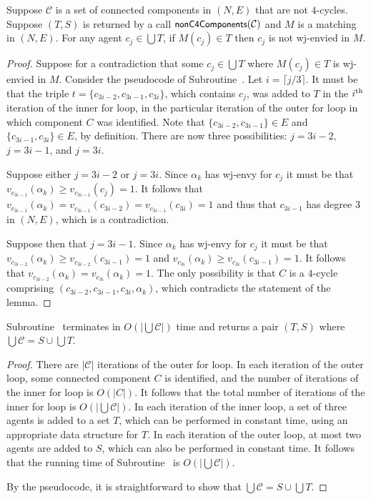 \begin{lem}
\label{lem:threed_efr_as_max_degree_2_subgraph_nonC4s}
Suppose $\mathcal{C}$ is a set of connected components in $(N, E)$ that are not $4$-cycles. Suppose $(T, S)$ is returned by a call $\algorithmfont{nonC4Components}(\mathcal{C})$ and $M$ is a matching in $(N, E)$. For any agent $c_j \in \bigcup T$, if $M(c_j) \in T$ then $c_j$ is not wj-envied in $M$.
\end{lem}
\begin{proof}
Suppose for a contradiction that some $c_j \in \bigcup T$ where $M(c_j) \in T$ is wj-envied in $M$. Consider the pseudocode of Subroutine~. Let $i = \lceil j/3 \rceil$. It must be that the triple $t = \{ c_{3i-2}, c_{3i-1}, c_{3i} \}$, which contains $c_j$, was added to $T$ in the $i\textsuperscript{th}$ iteration of the inner for loop, in the particular iteration of the outer for loop in which component $C$ was identified. Note that $\{ c_{3i-2}, c_{3i-1} \} \in E$ and $\{ c_{3i-1}, c_{3i} \} \in E$, by definition. There are now three possibilities: $j = 3i-2$, $j=3i-1$, and $j=3i$.

Suppose either $j = 3i-2$ or $j=3i$. Since $\alpha_k$ has wj-envy for $c_j$ it must be that $v_{c_{3i-1}}(\alpha_k) \geq v_{c_{3i-1}}(c_j) = 1$. It follows that $v_{c_{3i-1}}(\alpha_k) = v_{c_{3i-1}}(c_{3i-2}) = v_{c_{3i-1}}(c_{3i}) = 1$ and thus that $c_{3i-1}$ has degree $3$ in $(N, E)$, which is a contradiction.

Suppose then that $j=3i-1$. Since $\alpha_k$ has wj-envy for $c_j$ it must be that $v_{c_{3i-2}}(\alpha_k) \geq v_{c_{3i-2}}(c_{3i-1}) = 1$ and $v_{c_{3i}}(\alpha_k) \geq v_{c_{3i}}(c_{3i-1}) = 1$. It follows that $v_{c_{3i-2}}(\alpha_k) = v_{c_{3i}}(\alpha_k) = 1$. The only possibility is that $C$ is a $4$-cycle comprising $( c_{3i-2}, c_{3i-1}, c_{3i}, \alpha_k )$, which contradicts the statement of the lemma.
\end{proof}

\begin{lem}
\label{lem:threed_efr_as_wjenvy_max_degree_2_nonC4s}
Subroutine~ terminates in $O(|\bigcup \mathcal{C}|)$ time and returns a pair $(T, S)$ where $\bigcup \mathcal{C} = S \cup \bigcup T$.
\end{lem}
\begin{proof}
There are $|\mathcal{C}|$ iterations of the outer for loop. In each iteration of the outer loop, some connected component $C$ is identified, and the number of iterations of the inner for loop is $O(|C|)$. It follows that the total number of iterations of the inner for loop is $O(|\bigcup \mathcal{C}|)$. In each iteration of the inner loop, a set of three agents is added to a set $T$, which can be performed in constant time, using an appropriate data structure for $T$. In each iteration of the outer loop, at most two agents are added to $S$, which can also be performed in constant time. It follows that the running time of Subroutine~ is $O(|\bigcup \mathcal{C}|)$.

By the pseudocode, it is straightforward to show that $\bigcup \mathcal{C} = S \cup \bigcup T$.
\end{proof}

